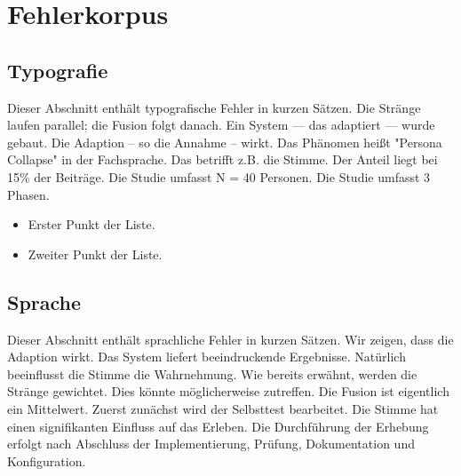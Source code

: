 \chapter{Fehlerkorpus} %
\label{chap:fehler}

\section{Typografie}
\label{sec:typo}

Dieser Abschnitt enthält typografische Fehler in kurzen Sätzen. %
Die Stränge laufen parallel; die Fusion folgt danach. %
Ein System — das adaptiert — wurde gebaut. %
Die Adaption -- so die Annahme -- wirkt. %
Das Phänomen heißt "Persona Collapse" in der Fachsprache. %
Das betrifft z.B. die Stimme. %
Der Anteil liegt bei 15\% der Beiträge. %
Die Studie umfasst N = 40 Personen. %
Die Studie umfasst 3 Phasen. %

\begin{itemize}
    \item Erster Punkt der Liste.

    \item Zweiter Punkt der Liste. %
\end{itemize}

\section{Sprache}
\label{sec:sprache} %

Dieser Abschnitt enthält sprachliche Fehler in kurzen Sätzen. %
Wir zeigen, dass die Adaption wirkt. %
Das System liefert beeindruckende Ergebnisse. %
Natürlich beeinflusst die Stimme die Wahrnehmung. %
Wie bereits erwähnt, werden die Stränge gewichtet. %
Dies könnte möglicherweise zutreffen. %
Die Fusion ist eigentlich ein Mittelwert. %
Zuerst zunächst wird der Selbsttest bearbeitet. %
Die Stimme hat einen signifikanten Einfluss auf das Erleben. %
Die Durchführung der Erhebung erfolgt nach Abschluss der Implementierung, Prüfung, Dokumentation und Konfiguration. %

